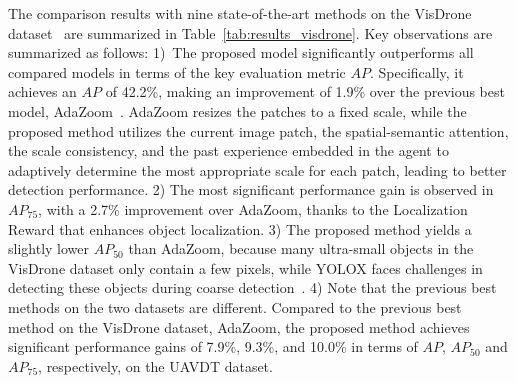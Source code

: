 \documentclass[letterpaper]{article} %
\def \eg {\emph{e.g.}}
\begin{document}
The comparison results with nine state-of-the-art methods on the VisDrone dataset~\cite{Zhu_2022_VisDrone} are summarized in Table~\ref{tab:results_visdrone}. %
Key observations are summarized as follows: 
1)~The proposed model significantly outperforms %
all compared models in terms of the key evaluation metric $AP$. Specifically, %
it achieves an $AP$ of 42.2\%, making an improvement of 1.9\% over the %
previous best model, AdaZoom~\cite{Xu_2022_AdaZoom}. AdaZoom resizes the patches to a fixed scale, while the proposed method %
utilizes the current image patch, the spatial-semantic attention, the scale consistency, and the past experience embedded in the agent to adaptively determine the most appropriate scale for each patch, %
leading to better detection performance. 2) %
The most significant performance gain is observed in $AP_{75}$, with a 2.7\% improvement over AdaZoom, thanks to the Localization Reward that enhances object localization. 
3) The proposed method yields a slightly lower $AP_{50}$ than AdaZoom, because many ultra-small objects in the VisDrone dataset only contain a few pixels, while YOLOX faces challenges in detecting these objects during coarse detection~\cite{wang2023improved}. 4) Note that %
the previous best methods on the two datasets are different. Compared to the previous best method on the VisDrone dataset, AdaZoom, the proposed method achieves significant performance gains of 7.9\%, 9.3\%, and 10.0\% in terms of $AP$, $AP_{50}$ and $AP_{75}$, respectively, on the UAVDT dataset.
\end{document}
